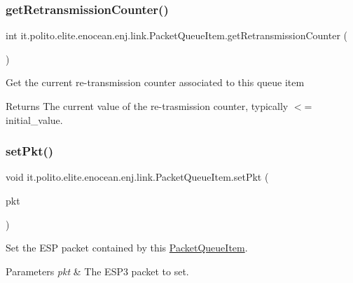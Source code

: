 \subsubsection{\texorpdfstring{get\+Retransmission\+Counter()}{getRetransmissionCounter()}}
{\footnotesize\ttfamily int it.\+polito.\+elite.\+enocean.\+enj.\+link.\+Packet\+Queue\+Item.\+get\+Retransmission\+Counter (\begin{DoxyParamCaption}{ }\end{DoxyParamCaption})}

Get the current re-\/transmission counter associated to this queue item

\begin{DoxyReturn}{Returns}
The current value of the re-\/trasmission counter, typically $<$= initial\+\_\+value. 
\end{DoxyReturn}
\hypertarget{classit_1_1polito_1_1elite_1_1enocean_1_1enj_1_1link_1_1_packet_queue_item_a5929fdf35cfc4f47f6c4e0ce5157e91d}{}\label{classit_1_1polito_1_1elite_1_1enocean_1_1enj_1_1link_1_1_packet_queue_item_a5929fdf35cfc4f47f6c4e0ce5157e91d} 
\subsubsection{\texorpdfstring{set\+Pkt()}{setPkt()}}
{\footnotesize\ttfamily void it.\+polito.\+elite.\+enocean.\+enj.\+link.\+Packet\+Queue\+Item.\+set\+Pkt (\begin{DoxyParamCaption}\item[{\hyperlink{classit_1_1polito_1_1elite_1_1enocean_1_1protocol_1_1serial_1_1v3_1_1network_1_1packet_1_1_e_s_p3_packet}{E\+S\+P3\+Packet}}]{pkt }\end{DoxyParamCaption})}

Set the E\+SP packet contained by this \hyperlink{classit_1_1polito_1_1elite_1_1enocean_1_1enj_1_1link_1_1_packet_queue_item}{Packet\+Queue\+Item}.


\begin{DoxyParams}{Parameters}
{\em pkt} & The E\+S\+P3 packet to set. \\
\hline
\end{DoxyParams}
\hypertarget{classit_1_1polito_1_1elite_1_1enocean_1_1enj_1_1link_1_1_packet_queue_item_a9e1ae9b98516abf72eb7fb5de6fcc853}{}\label{classit_1_1polito_1_1elite_1_1enocean_1_1enj_1_1link_1_1_packet_queue_item_a9e1ae9b98516abf72eb7fb5de6fcc853} 
